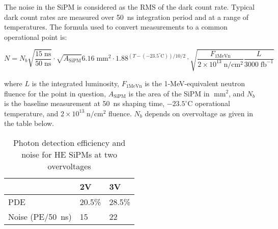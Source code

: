 \documentclass{article}[12pt]
\newcommand{\unit}[1]{\ensuremath{\mathrm{\;#1}}}
\begin{document}
The noise in the SiPM is considered as the RMS of the dark count rate.
Typical dark count rates are measured over 50~ns integration period
and at a range of temperatures.  The formula used to convert
measurements to a common operational point is:

\[
N=N_b \sqrt{\frac{15\unit{ns}}{50\unit{ns}}} \cdot \sqrt{A_\mathrm{SiPM}}{6.16\unit{mm^2}} \cdot 1.88^{(T-(-23.5^\circ\mathrm{C}))/10/2} \cdot \sqrt{\frac{F_\mathrm{1 MeV n}}{2\times 10^{13}\unit{n/cm^2}}\frac{L}{3000\unit{fb^{-1}}}}
\]

where $L$ is the integrated luminosity, $F_\mathrm{1 MeV n}$ is the
1-MeV-equivalent neutron fluence for the point in question,
$A_\mathrm{SiPM}$ is the area of the SiPM in \unit{mm^2}, and $N_b$ is
the baseline measurement at 50~ns shaping time,
$-23.5^\circ\mathrm{C}$ operational temperature, and $2\times
10^{13}\unit{n/cm^2}$ fluence.  $N_b$ depends on overvoltage as given in the table below.

\begin{table}[h]
  \caption{Photon detection efficiency and noise for HE SiPMs at two overvoltages}
  \centering
  \begin{tabular}{|l|l|l|}\hline
    & 2V & 3V \\ \hline
    PDE & 20.5\% & 28.5\% \\
    Noise (PE/50~ns) & 15 & 22 \\ \hline
  \end{tabular}
\end{table}
  
\end{document}
